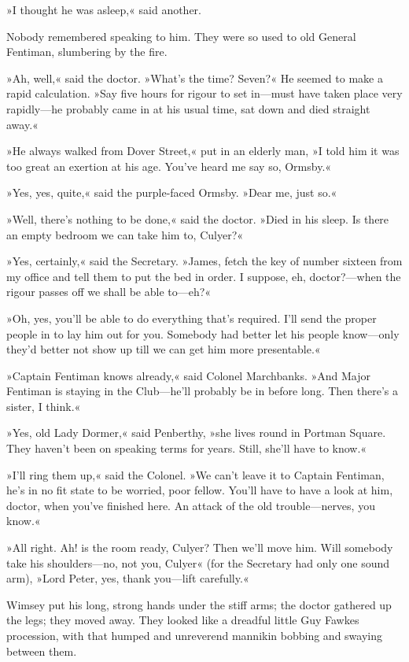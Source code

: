 »I thought he was asleep,« said another.

Nobody remembered speaking to him. They were so used to old General Fentiman, slumbering by the fire.

»Ah, well,« said the doctor. »What's the time? Seven?« He seemed to make a rapid calculation. »Say five hours for rigour to set in—must have taken place very rapidly—he probably came in at his usual time, sat down and died straight away.«

»He always walked from Dover Street,« put in an elderly man, »I told him it was too great an exertion at his age. You've heard me say so, Ormsby.«

»Yes, yes, quite,« said the purple-faced Ormsby. »Dear me, just so.«

»Well, there's nothing to be done,« said the doctor. »Died in his sleep. Is there an empty bedroom we can take him to, Culyer?«

»Yes, certainly,« said the Secretary. »James, fetch the key of number sixteen from my office and tell them to put the bed in order. I suppose, eh, doctor?—when the rigour passes off we shall be able to—eh?«

»Oh, yes, you'll be able to do everything that's required. I'll send the proper people in to lay him out for you. Somebody had better let his people know—only they'd better not show up till we can get him more presentable.«

»Captain Fentiman knows already,« said Colonel Marchbanks. »And Major Fentiman is staying in the Club—he'll probably be in before long. Then there's a sister, I think.«

»Yes, old Lady Dormer,« said Penberthy, »she lives round in Portman Square. They haven't been on speaking terms for years. Still, she'll have to know.«

»I'll ring them up,« said the Colonel. »We can't leave it to Captain Fentiman, he's in no fit state to be worried, poor fellow. You'll have to have a look at him, doctor, when you've finished here. An attack of the old trouble—nerves, you know.«

»All right. Ah! is the room ready, Culyer? Then we'll move him. Will somebody take his shoulders—no, not you, Culyer« (for the Secretary had only one sound arm), »Lord Peter, yes, thank you—lift carefully.«

Wimsey put his long, strong hands under the stiff arms; the doctor gathered up the legs; they moved away. They looked like a dreadful little Guy Fawkes procession, with that humped and unreverend mannikin bobbing and swaying between them.

